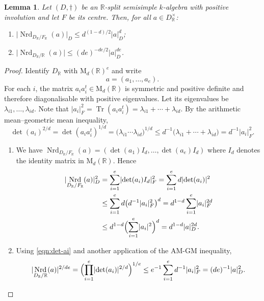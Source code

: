 \documentclass[JEP,XML,SOM,Unicode,NoFloatCountersInSection]{cedram}
\newenvironment{enumeratei}
{\bgroup\def\theenumi{\roman{enumi}}\def\theenumii{\alph{enumii}}\begin{enumerate}}
{\end{enumerate}\egroup}
\newcommand{\bR}{\mathbb{R}}
\newcommand{\rM}{\mathrm{M}}
\DeclareMathOperator{\Nrd}{Nrd}
\DeclareMathOperator{\Tr}{Tr}
\newcommand{\abs}[1]{\lvert #1 \rvert}
\newtheorem{lemma}{Lemma}[section]
\begin{document}
\begin{lemma} \label{Nrd-length-bound}
Let $(D, \dag)$ be an $\bR$-split semisimple $k$-algebra with positive involution and let $F$ be its centre.
Then, for all $a \in D_\bR^\times$:
\begin{enumeratei}
\item $\abs{\Nrd_{D_\bR/F_\bR}(a)}_D \leq d^{(1-d)/2} \abs{a}_D^d$;
\item $\abs{\Nrd_{D_\bR/\bR}(a)} \leq (de)^{-de/2} \abs{a}_D^{de}$.
\end{enumeratei}
\end{lemma}

\begin{proof}
Identify $D_\bR$ with $\rM_d(\bR)^e$ and write
\[
a = (a_1, \dotsc, a_e).
\]
For each $i$, the matrix $a_i a_i^t \in \rM_d(\bR)$ is symmetric and positive definite and therefore diagonalisable with positive eigenvalues. Let its eigenvalues be $\lambda_{i1}, \dotsc, \lambda_{id}$.
Note that $\abs{a_i}_F^2 = \Tr(a_i a_i^t) = \lambda_{i1} + \dotsb + \lambda_{id}$.
By the arithmetic mean--geometric mean inequality,
\begin{equation} \label{eqn:det-ai}
\det(a_i)^{2/d} = \det(a_i a_i^t)^{1/d} = \bigl( \lambda_{i1} \dotsm \lambda_{id} \bigr)^{1/d} \leq d^{-1} \bigl( \lambda_{i1} + \dotsb + \lambda_{id} \bigr) = d^{-1} \abs{a_i}_F^2.
\end{equation}

\begin{enumeratei}
\item We have $\Nrd_{D_\bR/F_\bR}(a) = (\det(a_1) I_d, \dotsc, \det(a_e)I_d)$ where $I_d$ denotes the identity matrix in $\rM_d(\bR)$.
Hence
\begin{align*}
\abs{\Nrd_{D_\bR/F_\bR}(a)}_D^2
& = \sum_{i=1}^e \abs{\det(a_i) I_d}_F^2
= \sum_{i=1}^e d \abs{\det(a_i)}^2
\\& \leq \sum_{i=1}^e d \bigl( d^{-1} \abs{a_i}_F^2 \bigr)^{d}
= d^{1-d} \sum_{i=1}^e \abs{a_i}_F^{2d}
\\& \leq d^{1-d} \Bigl( \sum_{i=1}^e \abs{a_i}^2 \Bigr)^d
= d^{1-d} \abs{a}_D^{2d}.
\end{align*}

\item Using \eqref{eqn:det-ai} and another application of the AM-GM inequality,
\[
\abs{\Nrd_{D_\bR/\bR}(a)}^{2/de} = \Bigl( \prod_{i=1}^e \abs{\det(a_i)}^{2/d} \Bigr)^{1/e}
\leq e^{-1} \sum_{i=1}^e d^{-1} \abs{a_i}_F^2 = (de)^{-1} \abs{a}_D^2.
\qedhere
\]
\end{enumeratei}
\end{proof}
\end{document}
